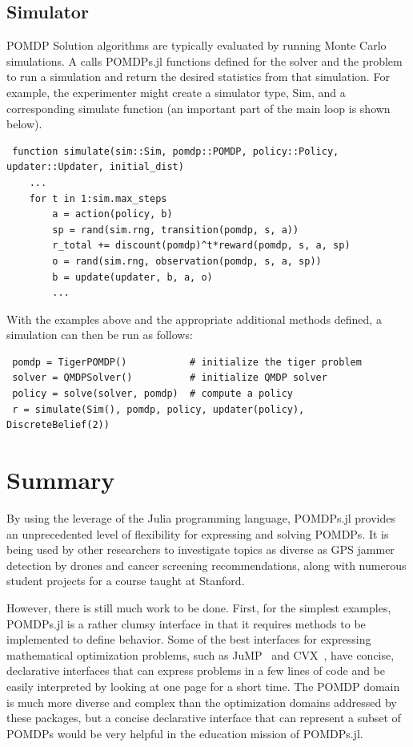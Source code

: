 \subsection{Simulator}

POMDP Solution algorithms are typically evaluated by running Monte Carlo simulations.
A  calls POMDPs.jl functions defined for the solver and the problem to run a simulation and return the desired statistics from that simulation.
For example, the experimenter might create a simulator type, {\ttfamily Sim}, and a corresponding {\ttfamily simulate} function (an important part of the main loop is shown below).
\begin{lstlisting}
 function simulate(sim::Sim, pomdp::POMDP, policy::Policy, updater::Updater, initial_dist)
    ...
    for t in 1:sim.max_steps
        a = action(policy, b)
        sp = rand(sim.rng, transition(pomdp, s, a))
        r_total += discount(pomdp)^t*reward(pomdp, s, a, sp)
        o = rand(sim.rng, observation(pomdp, s, a, sp))
        b = update(updater, b, a, o)
        ...
\end{lstlisting}

With the examples above and the appropriate additional methods defined, a simulation can then be run as follows: 
\begin{lstlisting}
 pomdp = TigerPOMDP()           # initialize the tiger problem
 solver = QMDPSolver()          # initialize QMDP solver
 policy = solve(solver, pomdp)  # compute a policy
 r = simulate(Sim(), pomdp, policy, updater(policy), DiscreteBelief(2))
\end{lstlisting}

\section{Summary}

By using the leverage of the Julia programming language, POMDPs.jl provides an unprecedented level of flexibility for expressing and solving POMDPs. It is being used by other researchers to investigate topics as diverse as GPS jammer detection by drones and cancer screening recommendations, along with numerous student projects for a course taught at Stanford.


However, there is still much work to be done.
First, for the simplest examples, POMDPs.jl is a rather clumsy interface in that it requires methods to be implemented to define behavior.
Some of the best interfaces for expressing mathematical optimization problems, such as JuMP~\cite{dunning2017jump} and CVX~\cite{grant2014cvx}, have concise, declarative interfaces that can express problems in a few lines of code and be easily interpreted by looking at one page for a short time.
The POMDP domain is much more diverse and complex than the optimization domains addressed by these packages, but a concise declarative interface that can represent a subset of POMDPs would be very helpful in the education mission of POMDPs.jl.


